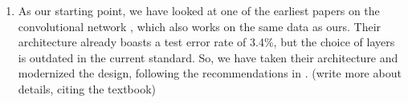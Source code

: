\documentclass[
	12pt, %
]{../Template/fphw}
\begin{document}
\begin{enumerate}[label = (\arabic*)]
    \item As our starting point, we have looked at one of the earliest papers on the convolutional network \cite{convnet_original}, which also works on the same data as ours. Their architecture already boasts a test error rate of 3.4\%, but the choice of layers is outdated in the current standard. So, we have taken their architecture and modernized the design, following the recommendations in \cite{Goodfellow-et-al-2016}. (write more about details, citing the textbook)
    
\end{enumerate}


\begin{figure}[!htbp]
    \centering

    






\begin{tikzpicture}[x=0.75pt,y=0.75pt,yscale=-1,xscale=1]


\end{tikzpicture}
\end{figure}
\end{document}
